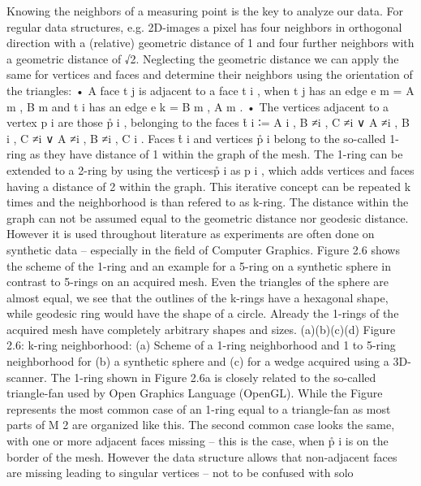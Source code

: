 \documentclass[openany]{book}
\begin{document}
Knowing the neighbors of a measuring point is the key to analyze our data. 
For regular data structures, e.g. 2D-images a pixel has four neighbors in 
orthogonal direction with a (relative) geometric distance of 1 and four further 
neighbors with a geometric distance of √2. Neglecting the geometric distance we 
can apply the same for vertices and faces and determine their neighbors using 
the orientation of the triangles:
• A face t j is adjacent to a face t i , when t j has an edge e m = {A m , B m } 
and t i has an edge e k = {B m , A m }.
• The vertices adjacent to a vertex p i are those p̊ i , belonging to the
faces t̊ i ∶= {A i , B ≠i , C ≠i } ∨ {A ≠i , B i , C ≠i } ∨ {A ≠i , B ≠i , C i }.
Faces t̊ i and vertices p̊ i belong to the so-called 1-ring as they have 
distance of 1 within the graph of the mesh. The 1-ring can be extended to a 
2-ring by using the verticesp̊ i as p i , which adds vertices and faces having 
a distance of 2 within the graph. This iterative concept can be repeated k times 
and the neighborhood is than refered to as k-ring. The distance within the graph 
can not be assumed equal to the geometric distance nor geodesic distance. 
However it is used throughout literature as experiments are often done on 
synthetic data – especially in the field of Computer Graphics. Figure 2.6 shows 
the scheme of the 1-ring and an example for a 5-ring on a synthetic sphere in 
contrast to 5-rings on an acquired mesh. Even the triangles of the sphere are 
almost equal, we see that the outlines of the k-rings have a hexagonal shape, 
while geodesic ring would have the shape of a circle. Already the 1-rings of 
the acquired mesh have completely arbitrary shapes and sizes.
(a)(b)(c)(d)
Figure 2.6: k-ring neighborhood: (a) Scheme of a 1-ring neighborhood and 1 to 
5-ring neighborhood for (b) a synthetic sphere and (c) for a wedge acquired 
using a 3D-scanner. The 1-ring shown in Figure 2.6a is closely related to the 
so-called triangle-fan used by Open Graphics Language (OpenGL). While the 
Figure represents the most common case of an 1-ring equal to a triangle-fan as 
most parts of M 2 are organized like this. The second common case looks the 
same, with one or more adjacent faces missing – this is the case, when p̊ i is 
on the border of the mesh. However the data structure allows that non-adjacent 
faces are missing leading to singular vertices – not to be confused with solo 
\end{document}
